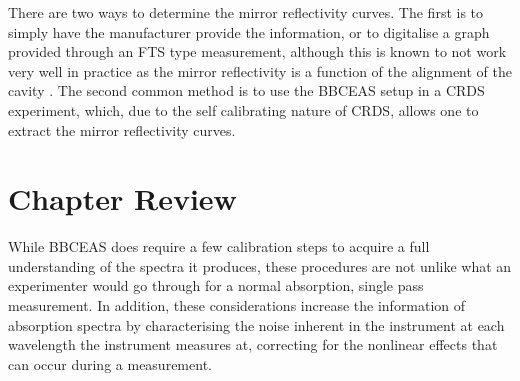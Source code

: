 There are two ways to determine the mirror reflectivity curves. The first is
to simply have the manufacturer provide the information, or to digitalise a
graph provided through an \ac{FTS} type measurement, although this is known to
not work very well in practice as the mirror reflectivity is a function of the
alignment of the cavity \cite{Berden:2009wk}. The second common method is to
use the \ac{BBCEAS} setup in a \ac{CRDS} experiment, which, due to the self
calibrating nature of \ac{CRDS}, allows one to extract the mirror reflectivity
curves.



\section*{Chapter Review}

While \ac{BBCEAS} does require a few calibration steps to acquire a full
understanding of the spectra it produces, these procedures are not unlike what
an experimenter would go through for a normal absorption, single pass
measurement. In addition, these considerations increase the information of
absorption spectra by characterising the noise inherent in the instrument at
each wavelength the instrument measures at, correcting for the nonlinear
effects that can occur during a measurement.
